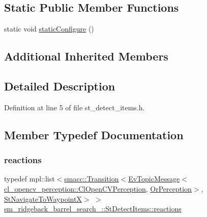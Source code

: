 \subsection*{Static Public Member Functions}
\begin{DoxyCompactItemize}
\item 
static void \hyperlink{structsm__ridgeback__barrel__search__1_1_1StDetectItems_ac707db37c8932864cbf56191f468a507}{static\+Configure} ()
\end{DoxyCompactItemize}
\subsection*{Additional Inherited Members}


\subsection{Detailed Description}


Definition at line 5 of file st\+\_\+detect\+\_\+items.\+h.



\subsection{Member Typedef Documentation}
\mbox{\label{structsm__ridgeback__barrel__search__1_1_1StDetectItems_a80033bef785c9240d22995e71b27ace9}} 
\subsubsection{\texorpdfstring{reactions}{reactions}}
{\footnotesize\ttfamily typedef mpl\+::list$<$\hyperlink{classsmacc_1_1Transition}{smacc\+::\+Transition}$<$\hyperlink{structsmacc_1_1default__events_1_1EvTopicMessage}{Ev\+Topic\+Message}$<$\hyperlink{classsm__ridgeback__barrel__search__1_1_1cl__opencv__perception_1_1ClOpenCVPerception}{cl\+\_\+opencv\+\_\+perception\+::\+Cl\+Open\+C\+V\+Perception}, \hyperlink{classsm__ridgeback__barrel__search__1_1_1OrPerception}{Or\+Perception}$>$, \hyperlink{structsm__ridgeback__barrel__search__1_1_1StNavigateToWaypointX}{St\+Navigate\+To\+WaypointX}$>$ $>$ \hyperlink{structsm__ridgeback__barrel__search__1_1_1StDetectItems_a80033bef785c9240d22995e71b27ace9}{sm\+\_\+ridgeback\+\_\+barrel\+\_\+search\+\_\+::\+St\+Detect\+Items\+::reactions}}



